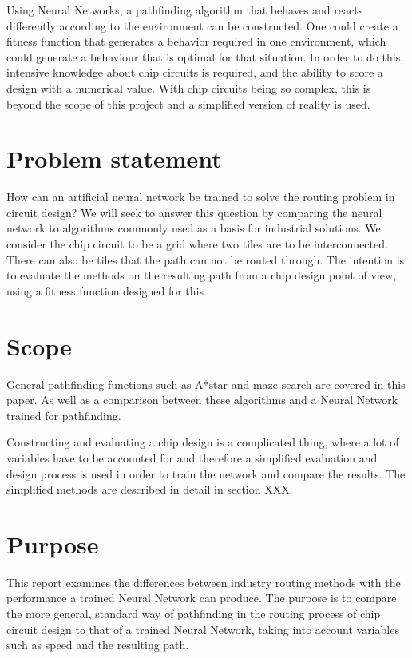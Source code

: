 \documentclass{kththesis}
\begin{document}
Using Neural Networks, a pathfinding algorithm that behaves and reacts differently according to the environment can be constructed. One could create a fitness function that generates a behavior required in one environment, which could generate a behaviour that is optimal for that situation. In order to do this, intensive knowledge about chip circuits is required, and the ability to score a design with a numerical value. With chip circuits being so complex, this is beyond the scope of this project and a simplified version of reality is used.





\section{Problem statement}
How can an artificial neural network be trained to solve the routing problem in circuit design? We will seek to answer this question by comparing the neural network to algorithms commonly used as a basis for industrial solutions.
 We consider the chip circuit to be a grid where two tiles are to be interconnected. There can also be tiles that the path can not be routed through.
The intention is to evaluate the methods on the resulting path from a chip design point of view, using a fitness function designed for this.

\section{Scope}
General pathfinding functions such as A*star and maze search are covered in this paper. As well as a comparison between these algorithms and a Neural Network trained for pathfinding. 

Constructing and evaluating a chip design is a complicated thing, where a lot of variables have to be accounted for and therefore a simplified evaluation and design process is used in order to train the network and compare the results. The simplified methods are described in detail in section XXX. 

\section{Purpose}
This report examines the differences between industry routing methods with the performance a trained Neural Network can produce. The purpose is to compare the more general, standard way of pathfinding in the routing process of chip circuit design to that of a trained Neural Network, taking into account variables such as speed and the resulting path. 
\end{document}
